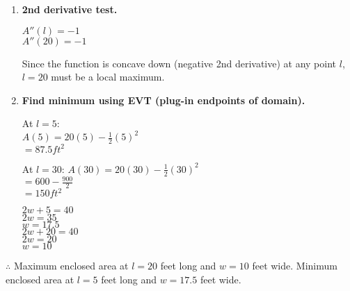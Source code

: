 \documentclass[12pt,fleqn]{book} %
\begin{document}
\begin{enumerate}
          \begin{center}
              domain of $l: [5, 30]$
          \end{center}
          {\small $l=20$ is within the domain. Now, we must see if this is a local max, local min, or neither. We can check max with the 2nd derivative test.} \\
    \item {\normalsize\textbf{2nd derivative test.}}
          \begin{center}
              $A''(l)=-1$ \\
              $A''(20)=-1$
          \end{center}
          {\small Since the function is concave down (negative 2nd derivative) at any point $l$, $l=20$ must be a local maximum.} \\
    \item {\normalsize\textbf{Find minimum using EVT (plug-in endpoints of domain).}}
          \begin{multicols}{2}
              \begin{center}
                  At $l=5$: \\
                  $A(5) = 20(5)-\frac{1}{2}(5)^2$ \\
                  \textbf{$= 87.5 ft^2$}

                  \columnbreak

                  At $l=30$:
                  $A(30) = 20(30)-\frac{1}{2}(30)^2$ \\
                  $= 600-\frac{900}{2}$ \\
                  $=150 ft^2$

              \end{center}
          \end{multicols}

          \begin{multicols}{2}
              \begin{center}
                  $2w+5=40$ \\
                  $2w=35$ \\
                  $w=17.5$ \\

                  \columnbreak
                  $2w+20=40$ \\
                  $2w=20$ \\
                  $w=10$

              \end{center}
          \end{multicols}

\end{enumerate}
{\small $\therefore$ Maximum enclosed area at $l=20$ feet long and $w=10$ feet wide. Minimum enclosed area at $l=5$ feet long and $w=17.5$ feet wide.}
\end{document}

